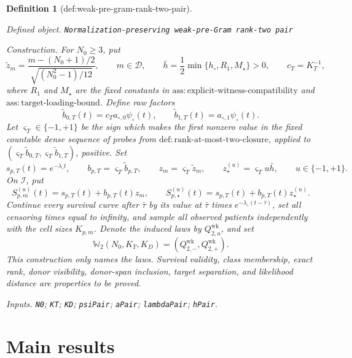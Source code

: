 \documentclass{article}
\newtheorem{definition}{Definition}
\begin{document}
\begin{definition}[def:weak-pre-gram-rank-two-pair]\label{def:weak-pre-gram-rank-two-pair}
\par\smallskip\noindent\emph{Defined object.} \texttt{Normalization-\allowbreak{}preserving weak-\allowbreak{}pre-\allowbreak{}Gram rank-\allowbreak{}two pair}
\par\smallskip\noindent\emph{Construction.} For \(N_0\ge3\), put
\[
 \widetilde z_m=
 \frac{m-(N_0+1)/2}{\sqrt{(N_0^2-1)/12}},
 \qquad m\in\mathcal D,
 \qquad
 \bar h=\frac12\min\{h_\circ,R_1,M_\star\}>0,
 \qquad c_T=K_T^{-1},
\]
where \(R_1\) and \(M_\star\) are the fixed constants in \(\mathrm{ass:explicit\mbox{-}witness\mbox{-}compatibility}\) and \(\mathrm{ass:target\mbox{-}loading\mbox{-}bound}\).  Define raw factors
\[
 \widetilde b_{0,T}(t)=c_Ta_{\circ,0}\psi_\circ(t),
 \qquad
 \widetilde b_{1,T}(t)=a_{\circ,1}\psi_\circ(t).
\]
Let \(\varsigma_T\in\{-1,+1\}\) be the sign which makes the first nonzero value in the fixed countable dense sequence of probes from \(\mathrm{def:rank\mbox{-}at\mbox{-}most\mbox{-}two\mbox{-}closure}\), applied to \((\varsigma_T\widetilde b_{0,T},\varsigma_T\widetilde b_{1,T})\), positive.  Set
\[
 s_{p,T}(t)=e^{-\lambda_\circ t},
 \qquad b_{p,T}=\varsigma_T\widetilde b_{p,T},
 \qquad z_m=\varsigma_T\widetilde z_m,
 \qquad z_\star^{(u)}=\varsigma_Tu\bar h,
 \qquad u\in\{-1,+1\}.
\]
On \(\mathcal I\), put
\[
 S_{p,m}^{(u)}(t)=s_{p,T}(t)+b_{p,T}(t)z_m,
 \qquad
 S_{p,\star}^{(u)}(t)=s_{p,T}(t)+b_{p,T}(t)z_\star^{(u)}.
\]
Continue every survival curve after \(\bar\tau\) by its value at \(\bar\tau\) times \(e^{-\lambda_\circ(t-\bar\tau)}\), set all censoring times equal to infinity, and sample all observed patients independently with the cell sizes \(K_{p,m}\).  Denote the induced laws by \(Q_{2,u}^{\mathrm{wk}}\), and set
\[
 \mathbb W_2(N_0,K_T,K_D)
 =(Q_{2,-}^{\mathrm{wk}},Q_{2,+}^{\mathrm{wk}}).
\]
This construction only names the laws.  Survival validity, class membership, exact rank, donor visibility, donor-span inclusion, target separation, and likelihood distance are properties to be proved.
\par\smallskip\noindent\emph{Inputs.} \texttt{N0}; \texttt{KT}; \texttt{KD}; \texttt{psiPair}; \texttt{aPair}; \texttt{lambdaPair}; \texttt{hPair}.
\end{definition}

\section{Main results}
\end{document}
